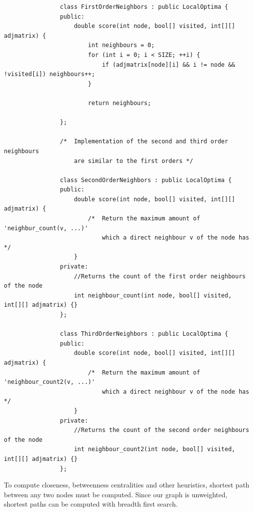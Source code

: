 \documentclass[12pt]{report}
\begin{document}
            \begin{verbatim}
                class FirstOrderNeighbors : public LocalOptima {
                public:
                    double score(int node, bool[] visited, int[][] adjmatrix) {
                        int neighbours = 0;
                        for (int i = 0; i < SIZE; ++i) {
                            if (adjmatrix[node][i] && i != node && !visited[i]) neighbours++;
                        }

                        return neighbours;
                                        
                };

                /*  Implementation of the second and third order neighbours 
                    are similar to the first orders */

                class SecondOrderNeighbors : public LocalOptima {
                public:
                    double score(int node, bool[] visited, int[][] adjmatrix) {
                        /*  Return the maximum amount of 'neighbur_count(v, ...)'
                            which a direct neighbour v of the node has */
                    }
                private:
                    //Returns the count of the first order neighbours of the node 
                    int neighbour_count(int node, bool[] visited, int[][] adjmatrix) {}
                };

                class ThirdOrderNeighbors : public LocalOptima {
                public:
                    double score(int node, bool[] visited, int[][] adjmatrix) {
                        /*  Return the maximum amount of 'neighbour_count2(v, ...)' 
                            which a direct neighbour v of the node has */
                    }
                private:
                    //Returns the count of the second order neighbours of the node 
                    int neighbour_count2(int node, bool[] visited, int[][] adjmatrix) {}
                };
            \end{verbatim}

            To compute closeness, betweenness centralities and other heuristics, shortest path between any two nodes must be computed. Since our graph is 
            unweighted, shortest paths can be computed with breadth first search.
\end{document}
